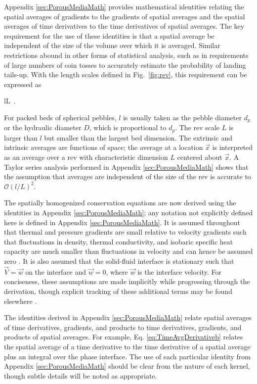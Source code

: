 Appendix \ref{sec:PorousMediaMath} provides mathematical identities relating the spatial averages of gradients to the gradients of spatial averages and the spatial averages of time derivatives to the time derivatives of spatial averages. The key requirement for the use of these identities is that a spatial average be independent of the size of the volume over which it is averaged. Similar restrictions abound in other forms of statistical analysis, such as in requirements of large numbers of coin tosses to accurately estimate the probability of landing tails-up. With the length scales defined in Fig.\ \ref{fig:rev}, this requirement can be expressed as

\beq
\label{eq:LengthReqs}
l\ll L\ .
\eeq

\noindent For packed beds of spherical pebbles, \(l\) is usually taken as the pebble diameter \(d_p\) or the hydraulic diameter \(D\), which is proportional to \(d_p\). The \gls{rev} scale \(L\) is larger than \(l\) but smaller than the largest bed dimension. The extrinsic and intrinsic averages are functions of space; the average at a location \(\vec{x}\) is interpreted as an average over a \gls{rev} with characteristic dimension \(L\) centered about \(\vec{x}\). A Taylor series analysis performed in Appendix \ref{sec:PorousMediaMath} shows that the assumption that averages are independent of the size of the \gls{rev} is accurate to \(\mathcal{O}(l/L)^2\).

The spatially homogenized conservation equations are now derived using the identities in Appendix \ref{sec:PorousMediaMath}; any notation not explicitly defined here is defined in Appendix \ref{sec:PorousMediaMath}. It is assumed throughout that thermal and pressure gradients are small relative to velocity gradients such that fluctuations in density, thermal conductivity, and isobaric specific heat capacity are much smaller than fluctuations in velocity and can hence be assumed zero \cite{gray}. It is also assumed that the solid-fluid interface is stationary such that \(\vec{V}=\vec{w}\) on the interface and \(\vec{w}=0\), where \(\vec{w}\) is the interface velocity. For conciseness, these assumptions are made implicitly while progressing through the derivation, though explicit tracking of these additional terms may be found elsewhere \cite{novak_manual}.

The identities derived in Appendix \ref{sec:PorousMediaMath} relate spatial averages of time derivatives, gradients, and products to time derivatives, gradients, and products of spatial averages. For example, Eq. \eqref{eq:TimeAvgDerivativeb} relates the spatial average of a time derivative to the time derivative of a spatial average plus an integral over the phase interface. The use of each particular identity from Appendix \ref{sec:PorousMediaMath} should be clear from the nature of each kernel, though subtle details will be noted as appropriate.

